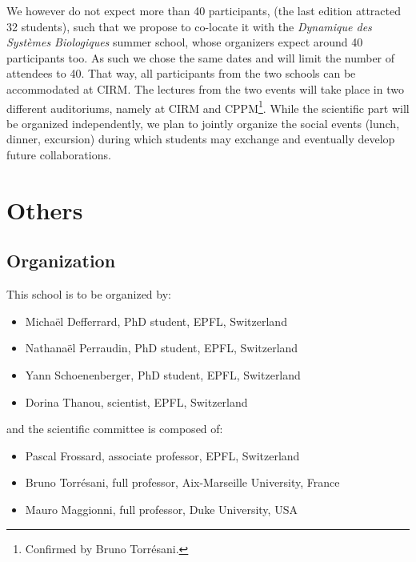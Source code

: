 \documentclass[a4paper]{scrartcl}
\begin{document}
We however do not expect more than 40 participants, (the last edition attracted
32 students), such that we propose to co-locate it with the \textit{Dynamique des
Systèmes Biologiques} summer school, whose organizers expect around 40
participants too. As such we chose the same dates and will limit the number of
attendees to 40. That way, all participants from the two schools can be
accommodated at CIRM. The lectures from the two events will take place in two
different auditoriums, namely at CIRM and CPPM\footnote{Confirmed by Bruno
Torrésani.}. While the scientific part will be organized independently, we plan
to jointly organize the social events (lunch, dinner, excursion) during which
students may exchange and eventually develop future collaborations.

\section{Others}

\subsection{Organization}

This school is to be organized by:
\begin{itemize}
	\setlength{\itemsep}{0pt} \setlength{\parskip}{0pt}
	\item Michaël Defferrard, PhD student, EPFL, Switzerland
	\item Nathanaël Perraudin, PhD student, EPFL, Switzerland
	\item Yann Schoenenberger, PhD student, EPFL, Switzerland
	\item Dorina Thanou, scientist, EPFL, Switzerland
\end{itemize}
and the scientific committee is composed of:
\begin{itemize}
	\setlength{\itemsep}{0pt} \setlength{\parskip}{0pt}
	\item Pascal Frossard, associate professor, EPFL, Switzerland
	\item Bruno Torrésani, full professor, Aix-Marseille University, France
	\item Mauro Maggionni, full professor, Duke University, USA
\end{itemize}
\end{document}
